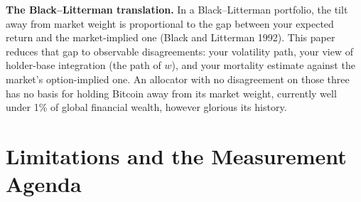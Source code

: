 \documentclass[11pt]{article}
\begin{document}
\textbf{The Black--Litterman translation.} In a Black--Litterman portfolio, the tilt away from market weight is proportional to the gap between your expected return and the market-implied one (Black and Litterman 1992). This paper reduces that gap to observable disagreements: your volatility path, your view of holder-base integration (the path of $w$), and your mortality estimate against the market's option-implied one. An allocator with no disagreement on those three has no basis for holding Bitcoin away from its market weight, currently well under 1\% of global financial wealth, however glorious its history.

\section{Limitations and the Measurement Agenda}
\end{document}
